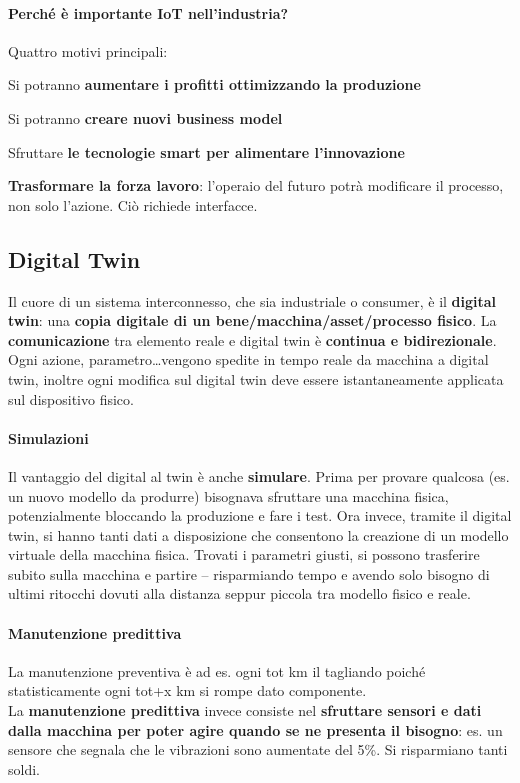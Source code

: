 \documentclass[10pt]{article}
\begin{document}
\paragraph{Perché è importante IoT nell'industria?} Quattro motivi principali:
\begin{list}{}{}
	\item Si potranno \textbf{aumentare i profitti ottimizzando la produzione}
	\item Si potranno \textbf{creare nuovi business model}
	\item Sfruttare \textbf{le tecnologie smart per alimentare l'innovazione}
	\item \textbf{Trasformare la forza lavoro}: l'operaio del futuro potrà modificare il processo, non solo l'azione. Ciò richiede interfacce.
\end{list}
\subsection{Digital Twin}
Il cuore di un sistema interconnesso, che sia industriale o consumer, è il \textbf{digital twin}: una \textbf{copia digitale di un bene/macchina/asset/processo fisico}. La \textbf{comunicazione} tra elemento reale e digital twin è \textbf{continua e bidirezionale}. Ogni azione, parametro\ldots vengono spedite in tempo reale da macchina a digital twin, inoltre ogni modifica sul digital twin deve essere istantaneamente applicata sul dispositivo fisico.
\paragraph{Simulazioni} Il vantaggio del digital al twin è anche \textbf{simulare}. Prima per provare qualcosa (es. un nuovo modello da produrre) bisognava sfruttare una macchina fisica, potenzialmente bloccando la produzione e fare i test. Ora invece, tramite il digital twin, si hanno tanti dati a disposizione che consentono la creazione di un modello virtuale della macchina fisica. Trovati i parametri giusti, si possono trasferire subito sulla macchina e partire -- risparmiando tempo e avendo solo bisogno di ultimi ritocchi dovuti alla distanza seppur piccola tra modello fisico e reale.
\paragraph{Manutenzione predittiva} La manutenzione preventiva è ad es. ogni tot km il tagliando poiché statisticamente ogni tot+x km si rompe dato componente.\\
La \textbf{manutenzione predittiva} invece consiste nel \textbf{sfruttare sensori e dati dalla macchina per poter agire quando se ne presenta il bisogno}: es. un sensore che segnala che le vibrazioni sono aumentate del 5\%. Si risparmiano tanti soldi.
\end{document}
